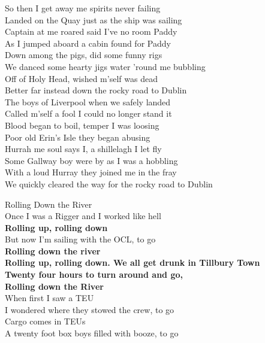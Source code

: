 \documentclass[letterpaper,9pt]{article}
\begin{document}
So then I get away me spirits never failing \\
Landed on the Quay just as the ship was sailing \\
Captain at me roared said I've no room Paddy \\
As I jumped aboard a cabin found for Paddy \\
Down among the pigs, did some funny rigs \\
We danced some hearty jigs water 'round me bubbling \\
Off of Holy Head, wished m'self was dead \\
Better far instead down the rocky road to Dublin \\

The boys of Liverpool when we safely landed \\
Called m'self a fool I could no longer stand it \\
Blood began to boil, temper I was loosing \\
Poor old Erin's Isle they began abusing \\
Hurrah me soul says I, a shillelagh I let fly \\
Some Gallway boy were by as I was a hobbling \\
With a loud Hurray they joined me in the fray \\
We quickly cleared the way for the rocky road to Dublin \\

\newpage
{}
\Huge
Rolling Down the River\\

\LARGE
Once I was a Rigger and I worked like hell \\
\textbf{Rolling up, rolling down} \\
But now I'm sailing with the OCL, to go \\
\textbf{Rolling down the river \\
Rolling up, rolling down. We all get drunk in Tillbury Town \\
Twenty four hours to turn around and go, \\
Rolling down the River} \\

When first I saw a TEU \\
I wondered where they stowed the crew, to go \\

Cargo comes in TEUs \\
A twenty foot box boys filled with booze, to go \\
\end{document}
